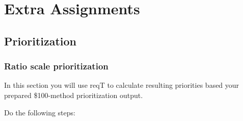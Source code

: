 \documentclass[11pt]{article}
\begin{document}
%
%
\clearpage\newpage
\section{Extra Assignments}\label{section:instr}

\subsection{Prioritization}


\subsubsection{Ratio scale prioritization}
In this section you will use reqT to calculate resulting priorities based your prepared \$100-method prioritization output. 
\begin{framed}
\noindent Do the following steps: 


\end{framed}
\end{document}
